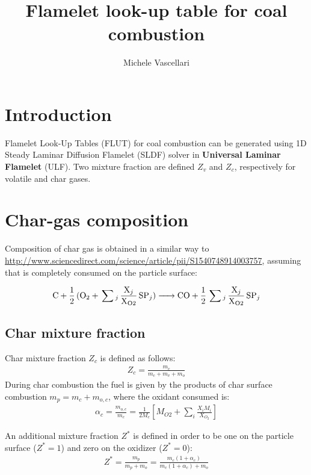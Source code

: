 \documentclass[]{scrartcl}
\title{Flamelet look-up table for coal combustion}
\author{Michele Vascellari}
\begin{document}
\maketitle

\begin{abstract}

\end{abstract}

\section{Introduction}
Flamelet Look-Up Tables (FLUT) for coal combustion can be generated using 1D Steady Laminar Diffusion Flamelet (SLDF) solver in \textbf{Universal Laminar Flamelet} (ULF).
Two mixture fraction are defined $Z_v$ and $Z_c$, respectively for volatile and char gases.

\section{Char-gas composition}
\label{sec:char-gas-composition}

Composition of char gas is obtained in a similar way to \url{http://www.sciencedirect.com/science/article/pii/S1540748914003757}, assuming that  is completely consumed on the particle surface:

\begin{equation}
\ce{C + 1/2 (O2 + \sum_j \frac{X_j}{X_{O2}} SP_j) -> CO + 1/2 \sum_j \frac{X_j}{X_{O2}} SP_j}
\end{equation}

\subsection{Char mixture fraction}
Char mixture fraction $Z_c$ is defined as follows:
\begin{eqnarray}
Z_c = \frac{m_c}{m_c+m_v+m_o}
\end{eqnarray}
During char combustion the fuel is given by the products of char surface combustion $m_p = m_c + m_{o,c}$, where the oxidant consumed is:
\begin{eqnarray}
\alpha_c = \frac{m_{o,c}}{m_c} = \frac{1}{2 M_c} \left[ M_{O2} + \sum_i \frac{X_i M_i}{X_{O_2}} \right]
\end{eqnarray}

An additional mixture fraction $Z^*$ is defined in order to be one on the particle surface ($Z^*=1$) and zero on the oxidizer ($Z^*=0$):
\begin{eqnarray}
Z^* = \frac{m_p}{m_p+m_o} = \frac{m_c (1+\alpha_c)}{m_c (1+\alpha_c) + m_o}
\end{eqnarray}
\end{document}
